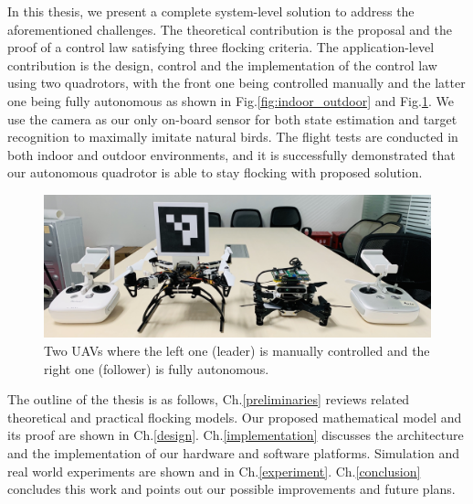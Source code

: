 In this thesis, we present a complete system-level solution to address the aforementioned challenges. The theoretical contribution is the proposal and the proof of a control law satisfying three flocking criteria. The application-level contribution is the design, control and the implementation of the control law using two quadrotors, with the front one being controlled manually and the latter one being fully autonomous as shown in Fig.\ref{fig:indoor_outdoor} and Fig.\ref{fig:twin}. We use the camera as our only on-board sensor for both state estimation and target recognition to maximally imitate natural birds. The flight tests are conducted in both indoor and outdoor environments, and it is successfully demonstrated that our autonomous quadrotor is able to stay flocking with proposed solution.

\begin{figure}[htb]
  \centering
  \includegraphics[width=1\textwidth]{figure/chapter_1/all.jpg}
  \caption{Two UAVs where the left one (leader) is manually controlled and the right one (follower) is fully autonomous.}
  \label{fig:twin}
\end{figure}

The outline of the thesis is as follows, Ch.\ref{preliminaries} reviews related theoretical and practical flocking models. Our proposed mathematical model and its proof are shown in Ch.\ref{design}. Ch.\ref{implementation} discusses the architecture and the implementation of our hardware and software platforms. Simulation and real world experiments are shown and in Ch.\ref{experiment}. Ch.\ref{conclusion} concludes this work and points out our possible improvements and future plans.

\newpage
